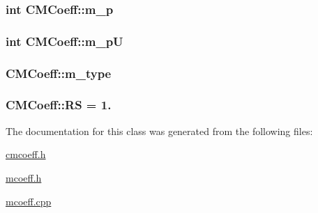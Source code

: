 \hypertarget{classCMCoeff_adf49f0bd55b7c496b887f547695aba38}{
\subsubsection[{m\-\_\-p}]{\setlength{\rightskip}{0pt plus 5cm}int C\-M\-Coeff\-::m\-\_\-p\hspace{0.3cm}{\ttfamily [protected]}}}\label{classCMCoeff_adf49f0bd55b7c496b887f547695aba38}
\hypertarget{classCMCoeff_ac00d5938d669575bf71826ee725ccf46}{
\subsubsection[{m\-\_\-p\-U}]{\setlength{\rightskip}{0pt plus 5cm}int C\-M\-Coeff\-::m\-\_\-p\-U\hspace{0.3cm}{\ttfamily [protected]}}}\label{classCMCoeff_ac00d5938d669575bf71826ee725ccf46}
\hypertarget{classCMCoeff_afe0cd2c61d33f32a058302fb53c33ccf}{
\subsubsection[{m\-\_\-type}]{ C\-M\-Coeff\-::m\-\_\-type\hspace{0.3cm}{\ttfamily [protected]}}}\label{classCMCoeff_afe0cd2c61d33f32a058302fb53c33ccf}
\hypertarget{classCMCoeff_a512caa3ff1994cbde85011489b8f34ce}{
\subsubsection[{R\-S}]{ C\-M\-Coeff\-::\-R\-S = 1.\hspace{0.3cm}{\ttfamily [static]}}}\label{classCMCoeff_a512caa3ff1994cbde85011489b8f34ce}


The documentation for this class was generated from the following files\-:\begin{DoxyCompactItemize}
\item 
\hyperlink{cmcoeff_8h}{cmcoeff.\-h}\item 
\hyperlink{mcoeff_8h}{mcoeff.\-h}\item 
\hyperlink{mcoeff_8cpp}{mcoeff.\-cpp}\end{DoxyCompactItemize}
